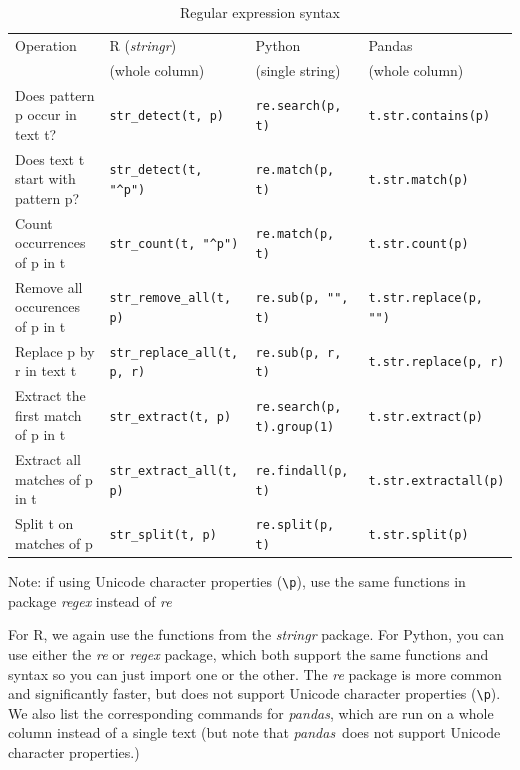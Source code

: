 \begin{table}
  \caption{\label{tab:regextract}Regular expression syntax}{
    \begin{tabularx}{\textwidth}{llll}
      \toprule
      Operation & R (\index{stringr}\emph{stringr}) & Python & Pandas \\
      & (whole column)  & (single string) & (whole column)\\
      \midrule
      Does pattern p occur in text t? & \texttt{\small{str\_detect(t, p)}} & \texttt{\small{re.search(p, t)}} & \texttt{\small{t.str.contains(p)}} \\
      Does text t start with pattern p? & \texttt{\small{str\_detect(t, "\^{}}p")} & \texttt{\small{re.match(p, t)}} & \texttt{\small{t.str.match(p)}} \\
      Count occurrences of p in t & \texttt{\small{str\_count(t, "\^{}}p")} & \texttt{\small{re.match(p, t)}} & \texttt{\small{t.str.count(p)}} \\
      Remove all occurences of p in t & \texttt{\small{str\_remove\_all(t, p)}} & \texttt{\small{re.sub(p, "", t)}} & \texttt{\small{t.str.replace(p, "")}} \\
      Replace p by r in text t & \texttt{\small{str\_replace\_all(t, p, r)}} & \texttt{\small{re.sub(p, r, t)}} & \texttt{\small{t.str.replace(p, r)}} \\
      Extract the first match of p in t & \texttt{\small{str\_extract(t, p)}} & \texttt{\small{re.search(p, t).group(1)}} & \texttt{\small{t.str.extract(p)}} \\
      Extract all matches of p in t & \texttt{\small{str\_extract\_all(t, p)}} & \texttt{\small{re.findall(p, t)}} & \texttt{\small{t.str.extractall(p)}} \\
      Split t on matches of p & \texttt{\small{str\_split(t, p)}} & \texttt{\small{re.split(p, t)}} & \texttt{\small{t.str.split(p)}} \\
      \bottomrule
      \end{tabularx}}{Note: if using Unicode character properties (\texttt{\small{\textbackslash{}}p}), use the same functions in package \emph{regex} instead of \emph{re}}
\end{table}


For R, we again use the functions from the \emph{stringr} package.
For Python, you can use either the \emph{re} or \emph{regex} package,
which both support the same functions and syntax so you can just import one or the other.
The \emph{re} package is more common and significantly faster, but does not support Unicode character properties (\verb|\p|).
We also list the corresponding commands for \emph{pandas}, which are run on a whole column instead of a single text
(but note that \emph{pandas}\ does not support Unicode character properties.)

